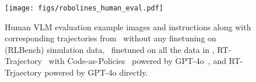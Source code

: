 
\begin{figure}[t]
    \centering
    \texttt{[image: figs/robolines\_human\_eval.pdf]}
    \caption{Human VLM evaluation example images and instructions along with corresponding trajectories from \method\ without any finetuning on (RLBench) simulation data, \method\ finetuned on all the data in , RT-Trajectory~\citep{gu2023rttrajectory} with Code-as-Policies~\citep{liang2023code} powered by GPT-4o~\citep{openai2024gpt4}, and RT-Trjaectory powered by GPT-4o directly.}
    \label{fig:human_eval}
\end{figure}